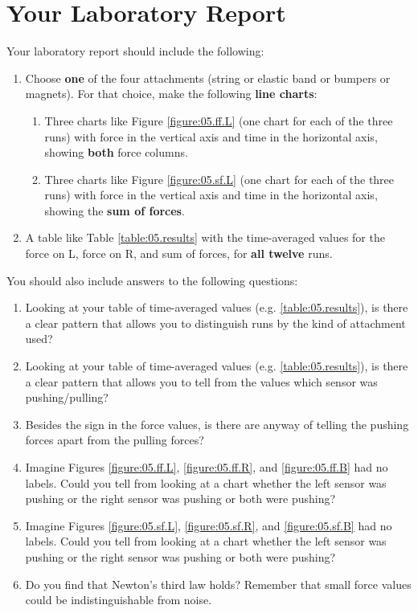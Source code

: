 \section{Your Laboratory Report}
%
Your laboratory report should include the following:
\begin{enumerate}
    \item Choose \textbf{one} of the four attachments (string or elastic band or bumpers or magnets). For that choice, make the following \textbf{line charts}:
    \begin{enumerate}
        \item Three charts like Figure \ref{figure:05.ff.L} (one chart for each of the three runs) with force in the vertical axis and time in the horizontal axis, showing \textbf{both} force columns.
        \item Three charts like Figure \ref{figure:05.sf.L} (one chart for each of the three runs) with force in the vertical axis and time in the horizontal axis, showing the \textbf{sum of forces}.
    \end{enumerate}
    \item A table like Table \ref{table:05.results} with the time-averaged values for the force on L, force on R, and sum of forces, for \textbf{all twelve} runs.
\end{enumerate}
You should also include answers to the following questions:
\begin{enumerate}
    \item Looking at your table of time-averaged values (e.g. \ref{table:05.results}), is there a clear pattern that allows you to distinguish runs by the kind of attachment used?
    \item Looking at your table of time-averaged values (e.g. \ref{table:05.results}), is there a clear pattern that allows you to tell from the values which sensor was pushing/pulling?
    \item Besides the sign in the force values, is there are anyway of telling the pushing forces apart from the pulling forces?
    \item Imagine Figures \ref{figure:05.ff.L}, \ref{figure:05.ff.R}, and \ref{figure:05.ff.B} had no labels. Could you tell from looking at a chart whether the left sensor was pushing or the right sensor was pushing or both were pushing?
    \item Imagine Figures \ref{figure:05.sf.L}, \ref{figure:05.sf.R}, and \ref{figure:05.sf.B} had no labels. Could you tell from looking at a chart whether the left sensor was pushing or the right sensor was pushing or both were pushing?
    \item Do you find that Newton's third law holds? Remember that small force values could be indistinguishable from noise.
\end{enumerate}
%
\newpage
